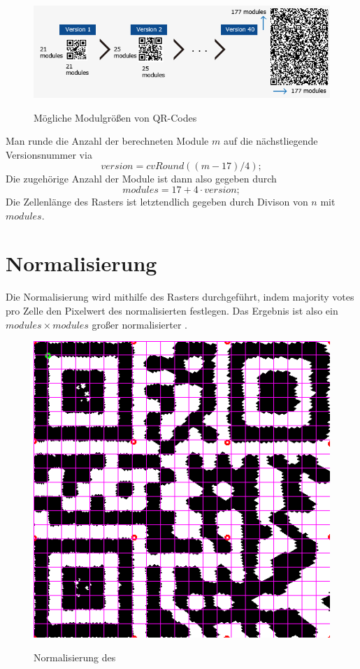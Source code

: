 \begin{figure}[h]
\centering
\includegraphics[scale=0.5]{images/QRVersion.png}
\label{fig:version-qrcode}\caption{Mögliche Modulgrößen von QR-Codes}
\end{figure}

Man runde die Anzahl der berechneten Module $m$ auf die nächstliegende Versionsnummer via
\begin{equation}
	version = cvRound((m-17)/4);
\end{equation}
Die zugehörige Anzahl der Module ist dann also gegeben durch
\begin{equation}
	modules = 17+4 \cdot version;
\end{equation} 
Die Zellenlänge des Rasters ist letztendlich gegeben durch Divison von $n$ mit $modules$.

\section{Normalisierung}
Die Normalisierung wird mithilfe des Rasters durchgeführt, indem majority votes pro Zelle den Pixelwert des normalisierten \QRCodes festlegen.
Das Ergebnis ist also ein $modules \times modules$ großer normalisierter \QRCode.
\begin{figure}[h]
\centering
\includegraphics[scale=0.25]{images/gitter.png}
\label{fig:version-qrcode}\caption{Normalisierung des \QRCode}
\end{figure}


